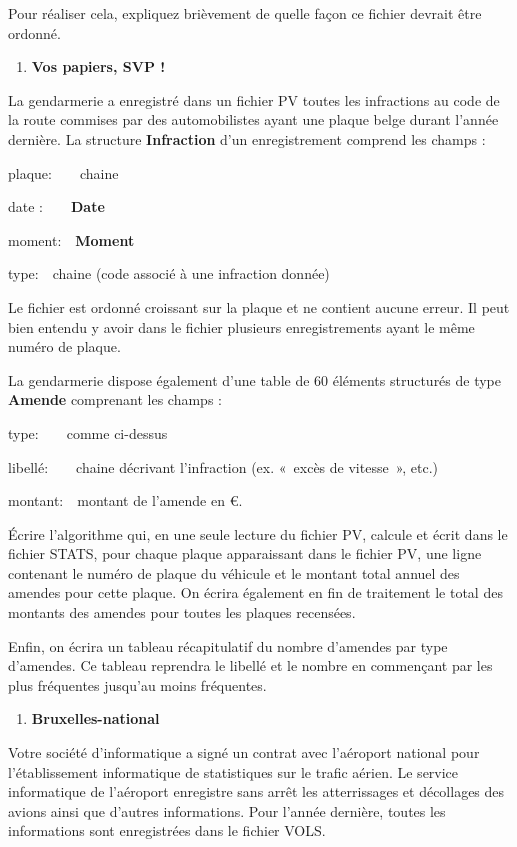 {
Pour réaliser cela, expliquez brièvement de quelle façon ce fichier
devrait être ordonné.}

\liststyleExercice
\setcounter{saveenum}{\value{enumi}}
\begin{enumerate}
\setcounter{enumi}{\value{saveenum}}
\item {\sffamily\bfseries
Vos papiers, SVP !}
\end{enumerate}
{
La gendarmerie a enregistré dans un fichier PV toutes les infractions au
code de la route commises par des automobilistes ayant une plaque belge
durant l’année dernière. La structure \textbf{Infraction} d’un
enregistrement comprend les champs :}

{
plaque:\ \ \ \ chaine}

{
date :\ \ \ \ \textbf{Date}}

{
moment:\ \ \textbf{Moment}}

{
type:\ \ chaine (code associé à une infraction donnée)}

{
Le fichier est ordonné croissant sur la plaque et ne contient aucune
erreur. Il peut bien entendu y avoir dans le fichier plusieurs
enregistrements ayant le même numéro de plaque.}

{
La gendarmerie dispose également d’une table 
de 60 éléments structurés de type \textbf{Amende} comprenant les champs
:}

{
type:\ \ \ \ comme ci-dessus}

{
libellé:\ \ \ \ chaine décrivant l’infraction (ex. «~excès de vitesse~»,
etc.)}

{
montant:\ \ montant de l’amende en €.}

{
Écrire l’algorithme qui, en une seule lecture du fichier PV, calcule et
écrit dans le fichier STATS, pour chaque plaque apparaissant dans le
fichier PV, une ligne contenant le numéro de plaque du véhicule et le
montant total annuel des amendes pour cette plaque. On écrira également
en fin de traitement le total des montants des amendes pour toutes les
plaques recensées.}

{
Enfin, on écrira un tableau récapitulatif du nombre d’amendes par type
d’amendes. Ce tableau reprendra le libellé et le nombre en commençant
par les plus fréquentes jusqu’au moins fréquentes. }

\liststyleExercice
\setcounter{saveenum}{\value{enumi}}
\begin{enumerate}
\setcounter{enumi}{\value{saveenum}}
\item {\sffamily\bfseries
Bruxelles-national}
\end{enumerate}
{
Votre société d’informatique a signé un contrat avec l’aéroport national
pour l’établissement informatique de statistiques sur le trafic aérien.
Le service informatique de l’aéroport enregistre sans arrêt les
atterrissages et décollages des avions ainsi que d’autres informations.
Pour l’année dernière, toutes les informations sont enregistrées dans
le fichier VOLS.}

